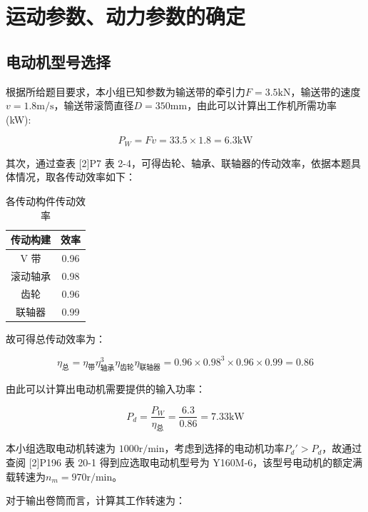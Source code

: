 \documentclass[12pt]{ctexart}
\begin{document}

\newpage

\tableofcontents

\newpage

\section{运动参数、动力参数的确定}

\subsection{电动机型号选择}

根据所给题目要求，本小组已知参数为输送带的牵引力$F=3.5\text{kN}$，输送带的速度$v=1.8\text{m/s}$，输送带滚筒直径$D=350\text{mm}$，由此可以计算出工作机所需功率 (kW):

$$P_W=Fv=33.5\times 1.8=6.3\text{kW}$$

其次，通过查表 [2]P7 表 2-4，可得齿轮、轴承、联轴器的传动效率，依据本题具体情况，取各传动效率如下：

\begin{table}[h]
    \setlength{\belowcaptionskip}{0.3cm}
    \centering
    
    \caption{各传动构件传动效率}
    \begin{tabular}{c c}
        \toprule
        传动构建 & 效率 \\
        \midrule
        V 带 & 0.96\\
        滚动轴承 & 0.98\\
        齿轮 & 0.96\\
        联轴器 & 0.99\\
        \bottomrule
    \end{tabular}
    
\end{table}

故可得总传动效率为：

$$\eta_\text{总} = \eta_\text{带}\eta^3_{\text{轴承}}\eta_{\text{齿轮}}\eta_{\text{联轴器}}=0.96\times 0.98^3\times 0.96\times 0.99 = 0.86$$

由此可以计算出电动机需要提供的输入功率：

$$P_d = \frac{P_W}{\eta_\text{总}} = \frac{6.3}{0.86} = 7.33\text{kW}$$

本小组选取电动机转速为 $1000\text{r/min}$，考虑到选择的电动机功率$P_d'>P_d$，故通过查阅 [2]P196 表 20-1 得到应选取电动机型号为 Y160M-6，该型号电动机的额定满载转速为$n_m=970\text{r/min}$。

对于输出卷筒而言，计算其工作转速为：
\end{document}
